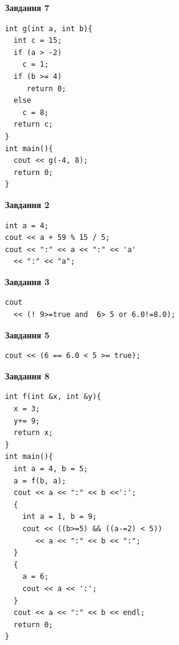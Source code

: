\documentclass[12pt, ukrainian]{article}
\begin{document}
{\begin {large}
\begin{minipage}[t]{7.0cm}
\begin{center}
\textbf{Завдання 7}
\end{center}
\vspace{-8mm}

\begin{verbatim}
int g(int a, int b){
  int c = 15;
  if (a > -2)
    c = 1;
  if (b >= 4)
     return 0;
  else
    c = 8;
  return c;
}
int main(){
  cout << g(-4, 8);
  return 0;
}
\end{verbatim}

\end{minipage}
\vline \hspace{1mm}
\begin{minipage}[t]{11.0cm}

\begin{center}
\textbf{Завдання 2}
\end{center}
\vspace{-8mm}

\begin{verbatim}
int a = 4;
cout << a + 59 % 15 / 5;
cout << ":" << a << ":" << 'a' 
  << ":" << "a";
\end{verbatim}



\begin{center}
\textbf{Завдання 3}
\end{center}
\vspace{-8mm}

\begin{verbatim}
cout 
  << (! 9>=true and  6> 5 or 6.0!=8.0);
\end{verbatim}



\begin{center}
\textbf{Завдання 5}
\end{center}
\vspace{-8mm}

\begin{verbatim}
cout << (6 == 6.0 < 5 >= true);
\end{verbatim}



\begin{center}
\textbf{Завдання 8}
\end{center}
\vspace{-8mm}

\begin{verbatim}
int f(int &x, int &y){
  x = 3;
  y+= 9;
  return x;
}
int main(){
  int a = 4, b = 5;
  a = f(b, a);
  cout << a << ":" << b <<':';
  {
    int a = 1, b = 9;
    cout << ((b>=5) && ((a-=2) < 5))
       << a << ":" << b << ":";
  }
  {
    a = 6;
    cout << a << ':';
  }
  cout << a << ":" << b << endl;
  return 0;
}
\end{verbatim}


\end{minipage}
\end{large}}
\end{document}
